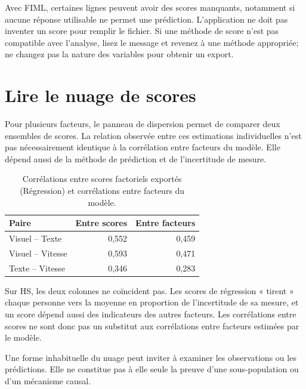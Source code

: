 \documentclass[
  french,
  11pt,
  a4paper,
  DIV=11,
  numbers=noendperiod]{scrreprt}
\begin{document}
Avec FIML, certaines lignes peuvent avoir des scores manquants,
notamment si aucune réponse utilisable ne permet une prédiction.
L'application ne doit pas inventer un score pour remplir le fichier. Si
une méthode de score n'est pas compatible avec l'analyse, lisez le
message et revenez à une méthode appropriée; ne changez pas la nature
des variables pour obtenir un export.

\section{Lire le nuage de scores}\label{lire-le-nuage-de-scores}

Pour plusieurs facteurs, le panneau de dispersion permet de comparer
deux ensembles de scores. La relation observée entre ces estimations
individuelles n'est pas nécessairement identique à la corrélation entre
facteurs du modèle. Elle dépend aussi de la méthode de prédiction et de
l'incertitude de mesure.


{

\begin{longtable}[]{@{}lrr@{}}

\caption{\label{tbl-scores-cor}Corrélations entre scores factoriels
exportés (Régression) et corrélations entre facteurs du modèle.}

\tabularnewline

\toprule\noalign{}
Paire & Entre scores & Entre facteurs \\
\midrule\noalign{}
\endhead
\bottomrule\noalign{}
\endlastfoot
Visuel -- Texte & 0,552 & 0,459 \\
Visuel -- Vitesse & 0,593 & 0,471 \\
Texte -- Vitesse & 0,346 & 0,283 \\

\end{longtable}

}

Sur HS, les deux colonnes ne coïncident pas. Les scores de régression «
tirent » chaque personne vers la moyenne en proportion de l'incertitude
de sa mesure, et un score dépend aussi des indicateurs des autres
facteurs. Les corrélations entre scores ne sont donc pas un substitut
aux corrélations entre facteurs estimées par le modèle.

Une forme inhabituelle du nuage peut inviter à examiner les observations
ou les prédictions. Elle ne constitue pas à elle seule la preuve d'une
sous-population ou d'un mécanisme causal.
\end{document}
